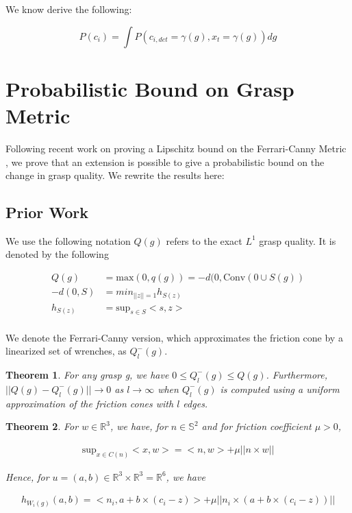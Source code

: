 \documentclass[letterpaper, 10 pt, conference]{ieeeconf}  %
\newtheorem{theorem}{Theorem}
\begin{document}
We know derive the following: 

\begin{equation}
P(c_{i}) = \int P(c_{i,det}=\gamma(g),x_t = \gamma(g)) dg
\end{equation}

\section{Probabilistic Bound on Grasp Metric}


Following recent work on proving a Lipschitz bound on the Ferrari-Canny Metric \cite{pokorny2013classical}, we prove that an extension is possible to give a probabilistic bound on the change in grasp quality. We rewrite the results here:

\subsection{Prior Work}

We use the following notation $Q(g)$ refers to the exact $L^1$ grasp quality. It is denoted by the following 

\begin{align}
Q(g) &= \mbox{max}(0,q(g)) = -d(0,\mbox{Conv}(0 \cup S(g))\\
-d(0,S) &= min_{||z|| = 1} h_{S(z)}\\
h_{S(z)} &= \mbox{sup}_{s\in S}<s,z>\\
\end{align}

We denote the Ferrari-Canny version, which approximates the friction cone by a linearized set of wrenches\cite{ferrari1992}, as $Q^-_l(g)$.\\

\begin{theorem}
For any grasp g, we have $0 \leq Q_l^-(g) \leq Q(g)$. Furthermore, $||Q(g) - Q^-_l(g)|| \rightarrow 0$ as $l \rightarrow \infty$ when $Q_l^-(g)$ is computed using a uniform approximation of the friction cones with $l$ edges. \\
\end{theorem}

\begin{theorem}
For $w \in \mathbb{R}^3$, we have, for $n \in \mathbb{S}^2$ and for friction coefficient $\mu > 0$, 

\begin{align}
\mbox{sup}_{x \in C(n)} <x,w> = <n,w> + \mu||n \times w||
\end{align}

Hence, for $u = (a,b) \in \mathbb{R}^3 \times \mathbb{R}^3 = \mathbb{R}^6$, we have 

\begin{align}
h_{W_i(g)}(a,b) = <n_i,a+b\times(c_i-z)>+\mu ||n_i \times (a+b\times(c_i-z))||
\end{align}

\end{theorem}
\end{document}
